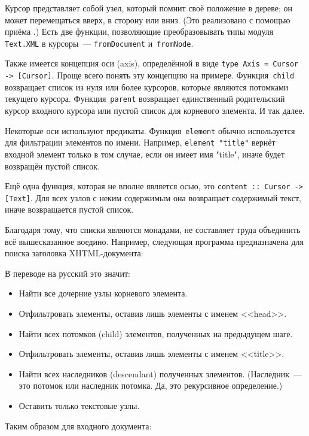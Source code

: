 Курсор представляет собой узел, который помнит своё положение в дереве; он может перемещаться вверх, в сторону или вниз. (Это реализовано с помощью приёма .) Есть две функции, позволяющие преобразовывать типы модуля \lstinline!Text.XML! в курсоры~--- \lstinline!fromDocument! и~\lstinline!fromNode!.

Также имеется концепция оси (axis), определённой в виде \lstinline!type Axis = Cursor -> [Cursor]!. Проще всего понять эту концепцию на примере. Функция~\lstinline'child' возвращает список из нуля или более курсоров, которые являются потомками текущего курсора. Функция~\lstinline'parent' возвращает единственный родительский курсор входного курсора или пустой список для корневого элемента. И так далее.

Некоторые оси используют предикаты. Функция~\lstinline!element! обычно используется для фильтрации элементов по имени. Например, \lstinline!element "title"! вернёт входной элемент только в том случае, если он имеет имя "title", иначе будет возвращён пустой список.

Ещё одна функция, которая не вполне является осью, это \lstinline!content :: Cursor -> [Text]!. Для всех узлов с неким содержимым она возвращает содержимый текст, иначе возвращается пустой список.

Благодаря тому, что списки являются монадами, не составляет труда объединить всё вышесказанное воедино. Например, следующая программа предназначена для поиска заголовка XHTML-документа:


В переводе на русский это значит:
\begin{itemize}
\item Найти все дочерние узлы корневого элемента.
\item Отфильтровать элементы, оставив лишь элементы с именем <<head>>.
\item Найти всех потомков (child) элементов, полученных на предыдущем шаге.
\item Отфильтровать элементы, оставив лишь элементы с именем <<title>>.
\item Найти всех наследников (descendant) полученных элементов. (Наследник~--- это потомок или наследник потомка. Да, это рекурсивное определение.)
\item Оставить только текстовые узлы.
\end{itemize}

Таким образом для входного документа:

